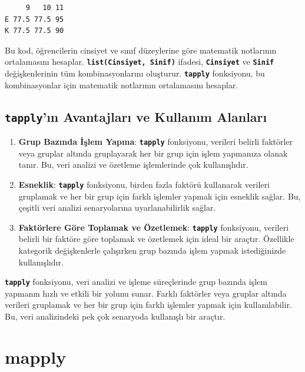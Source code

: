 \documentclass[
  letterpaper,
  DIV=11,
  numbers=noendperiod]{scrreprt}
\begin{document}
\begin{verbatim}
     9   10 11
E 77.5 77.5 95
K 77.5 77.5 90
\end{verbatim}

Bu kod, öğrencilerin cinsiyet ve sınıf düzeylerine göre matematik
notlarının ortalamasını hesaplar.
\textbf{\texttt{list(Cinsiyet,\ Sinif)}} ifadesi,
\textbf{\texttt{Cinsiyet}} ve \textbf{\texttt{Sinif}} değişkenlerinin
tüm kombinasyonlarını oluşturur. \textbf{\texttt{tapply}} fonksiyonu, bu
kombinasyonlar için matematik notlarının ortalamasını hesaplar.

\subsection{\texorpdfstring{\textbf{\texttt{tapply}'ın Avantajları ve
Kullanım
Alanları}}{tapply'ın Avantajları ve Kullanım Alanları}}\label{tapplyux131n-avantajlarux131-ve-kullanux131m-alanlarux131}

\begin{enumerate}
\def\labelenumi{\arabic{enumi}.}
\item
  \textbf{Grup Bazında İşlem Yapma}: \textbf{\texttt{tapply}}
  fonksiyonu, verileri belirli faktörler veya gruplar altında
  gruplayarak her bir grup için işlem yapmanıza olanak tanır. Bu, veri
  analizi ve özetleme işlemlerinde çok kullanışlıdır.
\item
  \textbf{Esneklik}: \textbf{\texttt{tapply}} fonksiyonu, birden fazla
  faktörü kullanarak verileri gruplamak ve her bir grup için farklı
  işlemler yapmak için esneklik sağlar. Bu, çeşitli veri analizi
  senaryolarına uyarlanabilirlik sağlar.
\item
  \textbf{Faktörlere Göre Toplamak ve Özetlemek}:
  \textbf{\texttt{tapply}} fonksiyonu, verileri belirli bir faktöre göre
  toplamak ve özetlemek için ideal bir araçtır. Özellikle kategorik
  değişkenlerle çalışırken grup bazında işlem yapmak istediğinizde
  kullanışlıdır.
\end{enumerate}

\textbf{\texttt{tapply}} fonksiyonu, veri analizi ve işleme süreçlerinde
grup bazında işlem yapmanın hızlı ve etkili bir yolunu sunar. Farklı
faktörler veya gruplar altında verileri gruplamak ve her bir grup için
farklı işlemler yapmak için kullanılabilir. Bu, veri analizindeki pek
çok senaryoda kullanışlı bir araçtır.

\section{mapply}\label{mapply}
\end{document}
